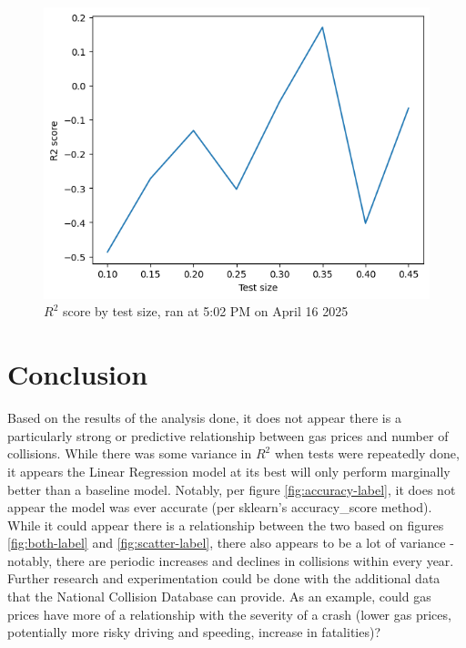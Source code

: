 \documentclass[runningheads]{llncs}
\begin{document}
\begin{figure}
    \centering
    \includegraphics[scale=0.75]{R2_502pm.png}   
    \caption{\(R^2\) score by test size, ran at 5:02 PM on April 16 2025}
    \label{fig:r2_later_label}
\end{figure}

\section{Conclusion}
Based on the results of the analysis done, it does not appear there is a particularly strong or predictive relationship between gas prices and number of collisions. While there was some variance in \(R^2\) when tests were repeatedly done, it appears the Linear Regression model at its best will only perform marginally better than a baseline model. Notably, per figure \ref{fig:accuracy-label}, it does not appear the model was ever accurate (per sklearn's accuracy\_score method). While it could appear there is a relationship between the two based on figures \ref{fig:both-label} and \ref{fig:scatter-label}, there also appears to be a lot of variance - notably, there are periodic increases and declines in collisions within every year. Further research and experimentation could be done with the additional data that the National Collision Database\cite{ref_url1} can provide. As an example, could gas prices have more of a relationship with the severity of a crash (lower gas prices, potentially more risky driving and speeding, increase in fatalities)? 
\end{document}
